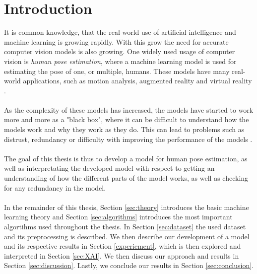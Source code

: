 \documentclass[./main.tex]{subfiles}
\begin{document}
\section{Introduction}
It is common knowledge, that the real-world use of artificial intelligence and machine learning is growing rapidly. With this grow the need for accurate computer vision models is also growing. One widely used usage of computer vision is \textit{human pose estimation}, where a machine learning model is used for estimating the pose of one, or multiple, humans. These models have many real-world applications, such as motion analysis, augmented reality and virtual reality \cite{survey_2}.
\\
\\
As the complexity of these models has increased, the models have started to work more and more as a "black box", where it can be difficult to understand how the models work and why they work as they do. This can lead to problems such as distrust, redundancy or difficulty with improving the performance of the models \cite{Selvaraju}.
\\
\\
The goal of this thesis is thus to develop a model for human pose estimation, as well as interpretating the developed model with respect to getting an understanding of how the different parts of the model works, as well as checking for any redundancy in the model.
\\
\\
In the remainder of this thesis, Section \ref{sec:theory} introduces the basic machine learning theory and Section \ref{sec:algorithms} introduces the most important algortihms used throughout the thesis. In Section \ref{sec:dataset} the used dataset and its preprocessing is described. We then describe our development of a model and its respective results in Section \ref{experiement}, which is then explored and interpreted in Section \ref{sec:XAI}. We then discuss our approach and results in Section \ref{sec:discussion}. Lastly, we conclude our results in Section \ref{sec:conclusion}.
\end{document}
